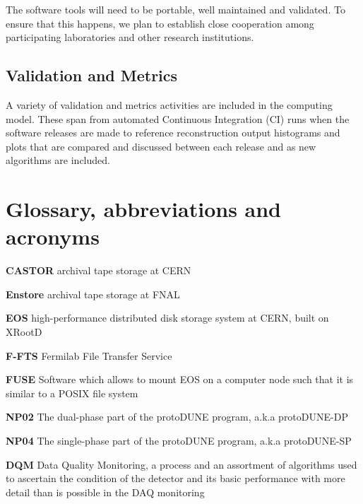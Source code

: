 \documentclass[12pt]{article}
\newcommand{\pd}{protoDUNE\xspace}
\begin{document}
{The software tools will need to be portable, well maintained and validated. To ensure that this happens,
we plan to establish close cooperation among participating laboratories and other research institutions.

\subsection{Validation and Metrics}
A variety of validation and metrics activities are included in the computing model. These span from automated Continuous Integration (CI) runs when the software releases are made to reference reconstruction output histograms and plots that are  compared and discussed between each release and as new algorithms are included. 


\newpage
\appendix
\section{Glossary, abbreviations and acronyms}
\label{sec:appendix-glossary}


\begin{description}

\item{\textbf{CASTOR}} archival tape storage at CERN

\item{\textbf{Enstore}} archival tape storage at FNAL

\item{\textbf{EOS}}  high-performance distributed disk storage system at CERN, built on XRootD

\item{\textbf{F-FTS}} Fermilab File Transfer Service

\item{\textbf{FUSE}} Software which allows to mount EOS on a computer node such that it is similar to a POSIX file system

\item{\textbf{NP02}} The dual-phase part of the \pd program, a.k.a \pd-DP

\item{\textbf{NP04}} The single-phase part of the \pd program, a.k.a \pd-SP

\item{\textbf{DQM}} Data Quality Monitoring, a process and an assortment of algorithms used to ascertain
the condition of the detector and its basic performance with more detail than is possible in the DAQ monitoring


\end{description}}
\end{document}

